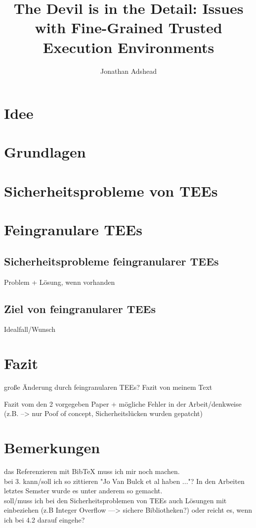 \documentclass[sigconf]{acmart}
\title{The Devil is in the Detail: Issues with Fine-Grained Trusted Execution Environments}
\author{Jonathan Adshead}
\affiliation{
    \institution{Friedricht-Alexander-Universität Erlangen-Nürnberg}
    \country{}}
\begin{document}
\maketitle  %




\section{Idee}



\section{Grundlagen}



\section{Sicherheitsprobleme von TEEs}



\section{Feingranulare TEEs}



\subsection{Sicherheitsprobleme feingranularer TEEs}
Problem + Lösung, wenn vorhanden

\subsection{Ziel von feingranularer TEEs}
Idealfall/Wunsch

\section{Fazit} 

große Änderung durch feingranularen TEEs?
Fazit von meinem Text

Fazit vom den 2 vorgegeben Paper + mögliche Fehler in der Arbeit/denkweise (z.B. --> nur Poof of concept, Sicherheitslücken wurden gepatcht)









\section*{Bemerkungen}
das Referenzieren mit BibTeX muss ich mir noch machen.\\
bei 3. kann/soll ich so zittieren "Jo Van Bulck et al haben ..."? In den Arbeiten letztes Semster wurde es unter anderem so gemacht.
\\
soll/muss ich bei den Sicherheitsproblemen von TEEs auch Lösungen mit einbeziehen (z.B Integer Overflow —> sichere Bibliotheken?)
oder reicht es, wenn ich bei 4.2 darauf eingehe?
\end{document}
